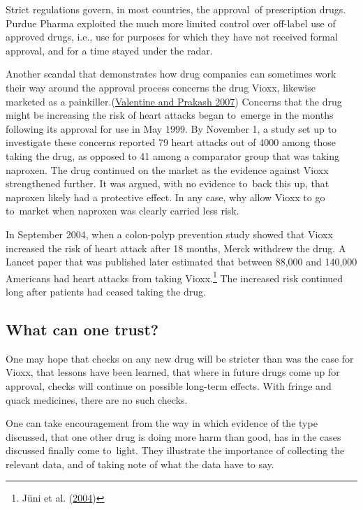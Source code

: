 \documentclass[
  10ptls,
  b5paper]{book}
\begin{document}
Strict regulations govern, in most countries, the approval~of
prescription drugs. Purdue Pharma exploited the much more
limited control over off-label use of approved drugs, i.e.,
use for purposes for which they have not received formal
approval, and for a time stayed under the radar.

Another scandal that demonstrates how drug companies can
sometimes work their way around the approval process
concerns the drug Vioxx, likewise marketed as a
painkiller.(\protect\hyperlink{ref-valentine2007timeline}{Valentine and Prakash 2007}) Concerns that the
drug might be increasing the risk of heart attacks began
to~emerge in the months following its approval for use
in May 1999. By November 1, a study set up to investigate
these concerns reported 79 heart attacks out of 4000
among those taking the drug, as opposed to 41 among a
comparator group that was taking naproxen. The drug
continued on the market as the evidence against Vioxx
strengthened further. It was argued, with no evidence
to~back this up, that naproxen likely had a protective
effect. In any case, why allow Vioxx to go to~market
when naproxen was clearly carried less risk.

In September 2004,
when a colon-polyp prevention study showed that Vioxx
increased the risk of heart attack after 18 months,
Merck withdrew the drug. A Lancet paper that was
published later estimated that between 88,000 and
140,000 Americans had heart attacks from taking
Vioxx.\footnote{Jüni et al. (\protect\hyperlink{ref-juni2004risk}{2004})} The increased risk continued
long after patients had ceased taking the drug.

\hypertarget{what-can-one-trust}{%
\subsection*{What can one trust?}\label{what-can-one-trust}}

One may hope that checks on any new drug will be
stricter than was the case for Vioxx, that lessons
have been learned, that where in future drugs come
up for approval, checks will continue on possible
long-term effects. With fringe and quack medicines,
there are no such checks.

One can take encouragement from the way in which
evidence of the type discussed, that one other drug
is doing more harm than good, has in the cases
discussed finally come to~light. They illustrate
the importance of collecting the relevant data, and
of taking note of what the data have to say.
\end{document}
